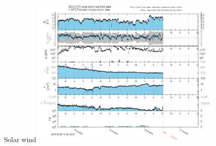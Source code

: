 \begin{frame}[plain,c]{Solar wind}{}
	\centering
	\includegraphics[width=0.7\textwidth]{../talk_figures/ace_realtime_ap_plot.png}
\end{frame}

